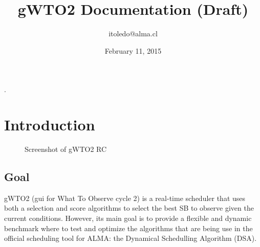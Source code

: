 \documentclass[a4paper,10pt,english]{sphinxmanual}
\title{gWTO2 Documentation (Draft)}
\date{February 11, 2015}
\author{itoledo@alma.cl}
\begin{document}
\maketitle
\tableofcontents
{}\label{index::doc}


.


\chapter{Introduction}
\label{intro2:introduction}\label{intro2:gwto2-documentation-contents}\label{intro2::doc}\begin{figure}[htbp]
\centering
\capstart

\caption{Screenshot of gWTO2 RC}\end{figure}


\section{Goal}
\label{intro2:goal}
gWTO2 (gui for What To Observe cycle 2) is a real-time scheduler that uses both
a selection and score algorithms to select the best SB to observe given the
current conditions. However, its main goal is to provide a flexible and dynamic
benchmark where to test and optimize the algorithms that are being use in the
official scheduling tool for ALMA: the Dynamical Schedulling Algorithm (DSA).
\end{document}
